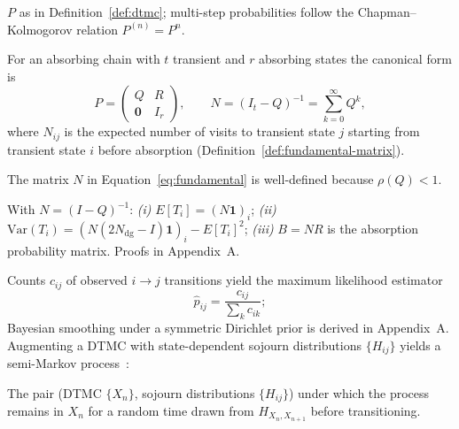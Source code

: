 \begin{definition}
\label{def:transition-matrix}
$P$ as in Definition~\ref{def:dtmc}; multi-step probabilities follow the
Chapman--Kolmogorov relation $P^{(n)} = P^n$.
\end{definition}

\begin{definition}
\label{def:absorbing}
For an absorbing chain with $t$ transient and $r$ absorbing states the
canonical form is
\begin{equation}
\label{eq:absorbing-form}
P = \begin{pmatrix} Q & R \\ \mathbf{0} & I_r \end{pmatrix},
\qquad
N = (I_t - Q)^{-1} = \sum_{k=0}^{\infty} Q^k,
\label{eq:fundamental}
\end{equation}
where $N_{ij}$ is the expected number of visits to transient state $j$
starting from transient state $i$ before absorption
(Definition~\ref{def:fundamental-matrix}).
\end{definition}

\begin{definition}
\label{def:fundamental-matrix}
The matrix $N$ in Equation~\ref{eq:fundamental} is well-defined because
$\rho(Q) < 1$.
\end{definition}

\begin{theorem}
\label{thm:absorption}
With $N = (I-Q)^{-1}$:
\emph{(i)} $E[T_i] = (N\mathbf{1})_i$;
\emph{(ii)} $\text{Var}(T_i) = (N(2N_{\text{dg}}-I)\mathbf{1})_i - E[T_i]^2$;
\emph{(iii)} $B = NR$ is the absorption probability matrix. Proofs in
Appendix~A.
\end{theorem}

Counts $c_{ij}$ of observed $i \to j$ transitions yield the maximum
likelihood estimator
\begin{equation}
\label{eq:mle-transition}
\hat{p}_{ij} = \frac{c_{ij}}{\sum_{k} c_{ik}};
\end{equation}
Bayesian smoothing under a symmetric Dirichlet prior is derived in
Appendix~A. Augmenting a DTMC with state-dependent sojourn distributions
$\{H_{ij}\}$ yields a semi-Markov
process~\cite{RoggeSolti2015NonMarkovianSPN}:

\begin{definition}
\label{def:semi-markov}
The pair (DTMC $\{X_n\}$, sojourn distributions $\{H_{ij}\}$) under which
the process remains in $X_n$ for a random time drawn from
$H_{X_n,X_{n+1}}$ before transitioning.
\end{definition}

